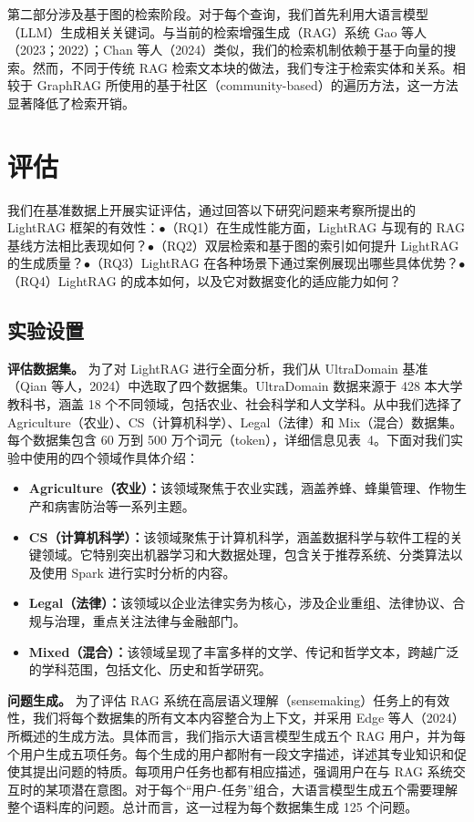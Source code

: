 \documentclass[11pt,UTF8,fontset=fandol]{ctexart}
\begin{document}
第二部分涉及基于图的检索阶段。对于每个查询，我们首先利用大语言模型（LLM）生成相关关键词。与当前的检索增强生成（RAG）系统 Gao 等人（2023；2022）；Chan 等人（2024）类似，我们的检索机制依赖于基于向量的搜索。然而，不同于传统 RAG 检索文本块的做法，我们专注于检索实体和关系。相较于 GraphRAG 所使用的基于社区（community-based）的遍历方法，这一方法显著降低了检索开销。

\section{评估}

我们在基准数据上开展实证评估，通过回答以下研究问题来考察所提出的 LightRAG 框架的有效性：$\bullet$（RQ1）在生成性能方面，LightRAG 与现有的 RAG 基线方法相比表现如何？$\bullet$（RQ2）双层检索和基于图的索引如何提升 LightRAG 的生成质量？$\bullet$（RQ3）LightRAG 在各种场景下通过案例展现出哪些具体优势？$\bullet$（RQ4）LightRAG 的成本如何，以及它对数据变化的适应能力如何？

\subsection{实验设置}

\textbf{评估数据集。} 为了对 LightRAG 进行全面分析，我们从 UltraDomain 基准（Qian 等人，2024）中选取了四个数据集。UltraDomain 数据来源于 428 本大学教科书，涵盖 18 个不同领域，包括农业、社会科学和人文学科。从中我们选择了 Agriculture（农业）、CS（计算机科学）、Legal（法律）和 Mix（混合）数据集。每个数据集包含 60 万到 500 万个词元（token），详细信息见表~4。下面对我们实验中使用的四个领域作具体介绍：

\begin{itemize}[leftmargin=1.5em]
\item \textbf{Agriculture（农业）：}该领域聚焦于农业实践，涵盖养蜂、蜂巢管理、作物生产和病害防治等一系列主题。
\item \textbf{CS（计算机科学）：}该领域聚焦于计算机科学，涵盖数据科学与软件工程的关键领域。它特别突出机器学习和大数据处理，包含关于推荐系统、分类算法以及使用 Spark 进行实时分析的内容。
\item \textbf{Legal（法律）：}该领域以企业法律实务为核心，涉及企业重组、法律协议、合规与治理，重点关注法律与金融部门。
\item \textbf{Mixed（混合）：}该领域呈现了丰富多样的文学、传记和哲学文本，跨越广泛的学科范围，包括文化、历史和哲学研究。
\end{itemize}

\textbf{问题生成。} 为了评估 RAG 系统在高层语义理解（sensemaking）任务上的有效性，我们将每个数据集的所有文本内容整合为上下文，并采用 Edge 等人（2024）所概述的生成方法。具体而言，我们指示大语言模型生成五个 RAG 用户，并为每个用户生成五项任务。每个生成的用户都附有一段文字描述，详述其专业知识和促使其提出问题的特质。每项用户任务也都有相应描述，强调用户在与 RAG 系统交互时的某项潜在意图。对于每个“用户-任务”组合，大语言模型生成五个需要理解整个语料库的问题。总计而言，这一过程为每个数据集生成 125 个问题。
\end{document}
